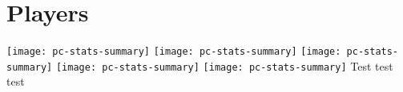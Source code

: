 \section{Players}
\texttt{[image: pc-stats-summary]}
\texttt{[image: pc-stats-summary]}
\texttt{[image: pc-stats-summary]}
\texttt{[image: pc-stats-summary]}
\texttt{[image: pc-stats-summary]}
Test test test
